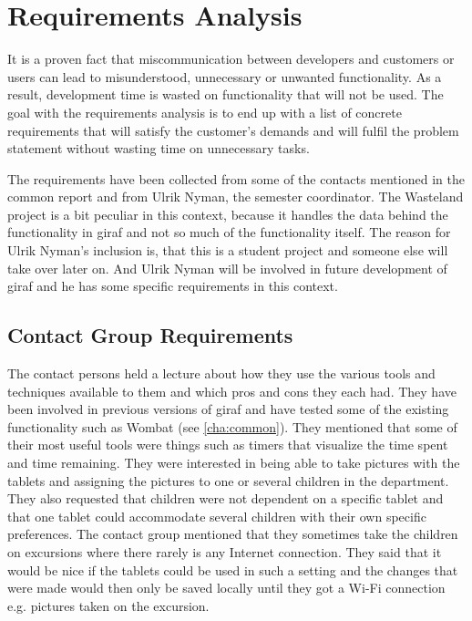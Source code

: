 \section{Requirements Analysis}
It is a proven fact that miscommunication between developers and customers or users can lead to misunderstood, unnecessary or unwanted functionality.\cite{req_wrong} %
As a result, development time is wasted on functionality that will not be used. The goal with the requirements analysis is to end up with a list of concrete requirements that will satisfy the customer's demands and will fulfil the problem statement without wasting time on unnecessary tasks. 

The requirements have been collected from some of the contacts mentioned in the common report and from Ulrik Nyman, the semester coordinator. The Wasteland project is a bit peculiar in this context, because it handles the data behind the functionality in \ac{giraf} and not so much of the functionality itself. The reason for Ulrik Nyman's inclusion is, that this is a student project and someone else will take over later on. And Ulrik Nyman will be involved in future development of \ac{giraf} and he has some specific requirements in this context.

\subsection{Contact Group Requirements}
The contact persons held a lecture about how they use the various tools and techniques available to them and which pros and cons they each had. They have been involved in previous versions of \ac{giraf} and have tested some of the existing functionality such as Wombat (see \autoref{cha:common}). They mentioned that some of their most useful tools were things such as timers that visualize the time spent and time remaining. They were interested in being able to take pictures with the tablets and assigning the pictures to one or several children in the department. They also requested that children were not dependent on a specific tablet and that one tablet could accommodate several children with their own specific preferences. The contact group mentioned that they sometimes take the children on excursions where there rarely is any Internet connection. They said that it would be nice if the tablets could be used in such a setting and the changes that were made would then only be saved locally until they got a Wi-Fi connection e.g. pictures taken on the excursion.

